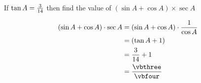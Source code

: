 


\FRACADD\vbone{}\vbthree\vbfour

\question[1]  If $\tan A = \frac{3}{14}$ then find the value of
$(\sin A + \cos A)\times\sec A$

\watchout

\ifprintanswers
\fi 

\begin{solution}[\mcq]
	\begin{align}
		(\sin A + \cos A)\cdot\sec A &= (\sin A + \cos A)\cdot\dfrac{1}{\cos A} \\
		                             &= (\tan A + 1) \\
		                             &= \dfrac\vbone\vbtwo + 1 \\
		                             &= \dfrac\vbthree\vbfour
	\end{align}
\end{solution}
